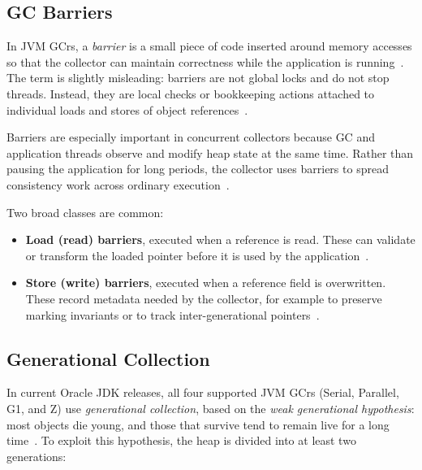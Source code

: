 \subsection{GC Barriers}
\label{subsec:bg-gc-barriers}

In \ac{JVM} \ac{GCr}s, a \emph{barrier} is a small piece of code inserted around memory accesses so that the collector can maintain correctness while the application is running~\cite{oracle-gc-implementation}. The term is slightly misleading: barriers are not global locks and do not stop threads. Instead, they are local checks or bookkeeping actions attached to individual loads and stores of object references~\cite{oracle-gc-implementation,jep333-zgc,openjdk-zbarrier-cpp}.

Barriers are especially important in concurrent collectors because \ac{GC} and application threads observe and modify heap state at the same time. Rather than pausing the application for long periods, the collector uses barriers to spread consistency work across ordinary execution~\cite{jep333-zgc,oracle-gc-implementation}.

Two broad classes are common:

\begin{itemize}
    \item \textbf{Load (read) barriers}, executed when a reference is read. These can validate or transform the loaded pointer before it is used by the application~\cite{jep333-zgc,openjdk-zbarrier-cpp}.
    \item \textbf{Store (write) barriers}, executed when a reference field is overwritten. These record metadata needed by the collector, for example to preserve marking invariants or to track inter-generational pointers~\cite{oracle-gc-implementation,jep439-genzgc}.
\end{itemize}

\subsection{Generational Collection}
\label{subsec:bg-gc-generational}

In current Oracle \ac{JDK} releases, all four supported \ac{JVM} \ac{GCr}s (Serial, Parallel, G1, and Z) use \emph{generational collection}, based on the \emph{weak generational hypothesis}: most objects die young, and those that survive tend to remain live for a long time~\cite{lieberman81-realtime-gc}. To exploit this hypothesis, the heap is divided into at least two generations:

